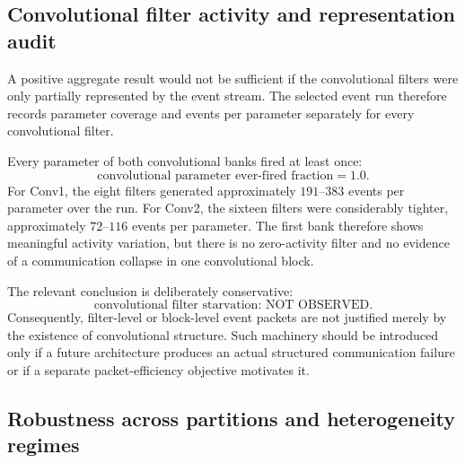 \subsection{Convolutional filter activity and representation audit}

A positive aggregate result would not be sufficient if the convolutional filters were only partially represented by the event stream. The selected event run therefore records parameter coverage and events per parameter separately for every convolutional filter.

Every parameter of both convolutional banks fired at least once:
\begin{equation}
\boxed{\text{convolutional parameter ever-fired fraction}=1.0.}
\end{equation}
For Conv1, the eight filters generated approximately $191$--$383$ events per parameter over the run. For Conv2, the sixteen filters were considerably tighter, approximately $72$--$116$ events per parameter. The first bank therefore shows meaningful activity variation, but there is no zero-activity filter and no evidence of a communication collapse in one convolutional block.

The relevant conclusion is deliberately conservative:
\begin{equation}
\boxed{\text{convolutional filter starvation: NOT OBSERVED}.}
\end{equation}
Consequently, filter-level or block-level event packets are not justified merely by the existence of convolutional structure. Such machinery should be introduced only if a future architecture produces an actual structured communication failure or if a separate packet-efficiency objective motivates it.

\subsection{Robustness across partitions and heterogeneity regimes}

